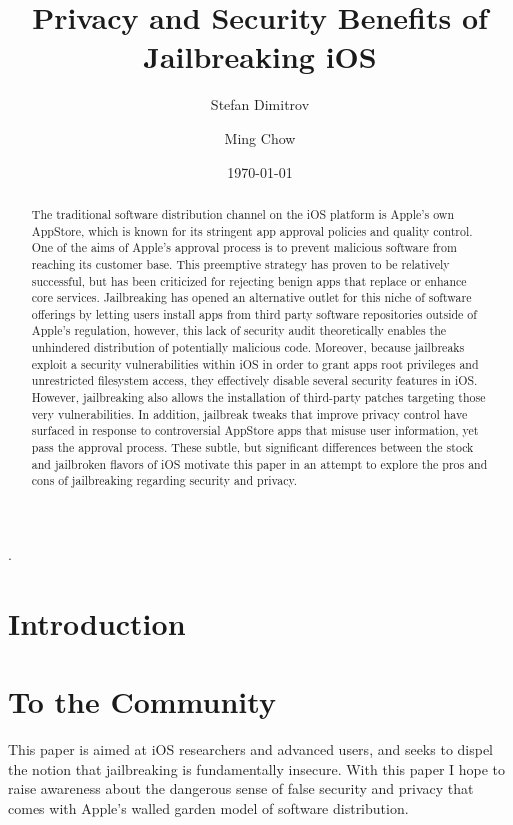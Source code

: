 \documentclass[12pt, titlepage, oneside]{amsart}
\title{Privacy and Security Benefits of Jailbreaking iOS}
\author{Stefan Dimitrov}
\author{Ming Chow}
\author{\today}
\begin{document}
\begin{abstract}

The traditional software distribution channel on the iOS platform is Apple's own AppStore, which is known for its stringent app approval policies and quality control. One of the aims of Apple's approval process is to prevent malicious software from reaching its customer base. This preemptive strategy has proven to be relatively successful, but has been criticized for rejecting benign apps that replace or enhance core services. Jailbreaking has opened an alternative outlet for this niche of software offerings by letting users install apps from third party software repositories outside of Apple's regulation, however, this lack of security audit theoretically enables the unhindered distribution of potentially malicious code. Moreover, because jailbreaks exploit a security vulnerabilities within iOS in order to grant apps root privileges and unrestricted filesystem access, they effectively disable several security features in iOS. However, jailbreaking also allows the installation of third-party patches targeting those very vulnerabilities. In addition, jailbreak tweaks that improve privacy control have surfaced in response to controversial AppStore apps that misuse user information, yet pass the approval process. These subtle, but significant differences between the stock and jailbroken flavors of iOS motivate this paper in an attempt to explore the pros and cons of jailbreaking regarding security and privacy.

\end{abstract}.

\maketitle


\tableofcontents

\pagebreak
\doublespacing

\section{Introduction}

\section{To the Community}
This paper is aimed at iOS researchers and advanced users, and seeks to dispel the notion that jailbreaking is fundamentally insecure. With this paper I hope to raise awareness about the dangerous sense of false security and privacy that comes with Apple's walled garden model of software distribution. 
\end{document}
